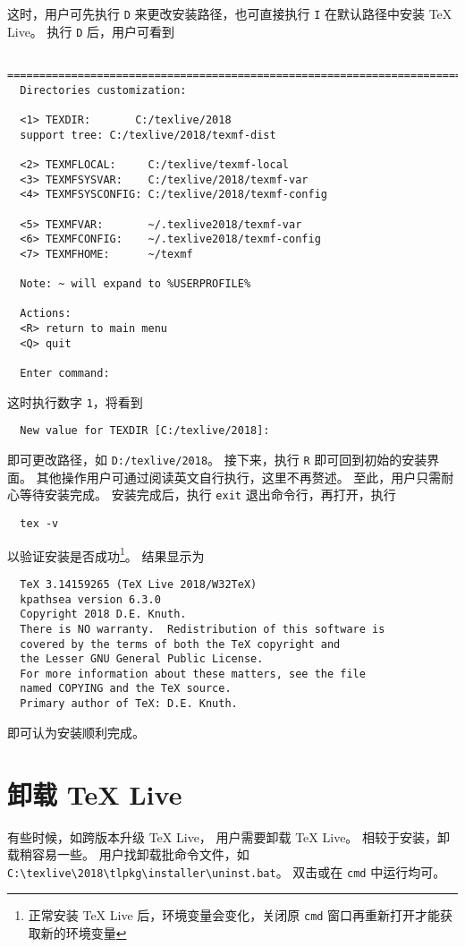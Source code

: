 \documentclass{ctexart}
\begin{document}
这时，用户可先执行 \texttt{D} 来更改安装路径，也可直接执行 \texttt{I} 在默认路径中安装 \TeX{} Live。
执行 \texttt{D} 后，用户可看到
\begin{lstlisting}
  ==============================================================================
  Directories customization:
  
  <1> TEXDIR:       C:/texlive/2018
  support tree: C:/texlive/2018/texmf-dist
  
  <2> TEXMFLOCAL:     C:/texlive/texmf-local
  <3> TEXMFSYSVAR:    C:/texlive/2018/texmf-var
  <4> TEXMFSYSCONFIG: C:/texlive/2018/texmf-config
  
  <5> TEXMFVAR:       ~/.texlive2018/texmf-var
  <6> TEXMFCONFIG:    ~/.texlive2018/texmf-config
  <7> TEXMFHOME:      ~/texmf
  
  Note: ~ will expand to %USERPROFILE%
  
  Actions:
  <R> return to main menu
  <Q> quit
  
  Enter command:
\end{lstlisting}
这时执行数字 \texttt{1}，将看到
\begin{lstlisting}
  New value for TEXDIR [C:/texlive/2018]:
\end{lstlisting}
即可更改路径，如 \texttt{D:/texlive/2018}。
接下来，执行 \texttt{R} 即可回到初始的安装界面。
其他操作用户可通过阅读英文自行执行，这里不再赘述。
至此，用户只需耐心等待安装完成。
安装完成后，执行 \texttt{exit} 退出命令行，再打开，执行
\begin{lstlisting}
  tex -v
\end{lstlisting}
以验证安装是否成功\footnote{正常安装 \TeX{} Live 后，环境变量会变化，关闭原 \texttt{cmd} 窗口再重新打开才能获取新的环境变量}。
结果显示为
\begin{lstlisting}
  TeX 3.14159265 (TeX Live 2018/W32TeX)
  kpathsea version 6.3.0
  Copyright 2018 D.E. Knuth.
  There is NO warranty.  Redistribution of this software is
  covered by the terms of both the TeX copyright and
  the Lesser GNU General Public License.
  For more information about these matters, see the file
  named COPYING and the TeX source.
  Primary author of TeX: D.E. Knuth.
\end{lstlisting}
即可认为安装顺利完成。

\section{卸载 \TeX{} Live}
有些时候，如跨版本升级 \TeX{} Live， 用户需要卸载 \TeX{} Live。
相较于安装，卸载稍容易一些。
用户找卸载批命令文件，如 \texttt{C:\textbackslash texlive\textbackslash 2018\textbackslash tlpkg\textbackslash installer\textbackslash uninst.bat}。
双击或在 \texttt{cmd} 中运行均可。
\end{document}
